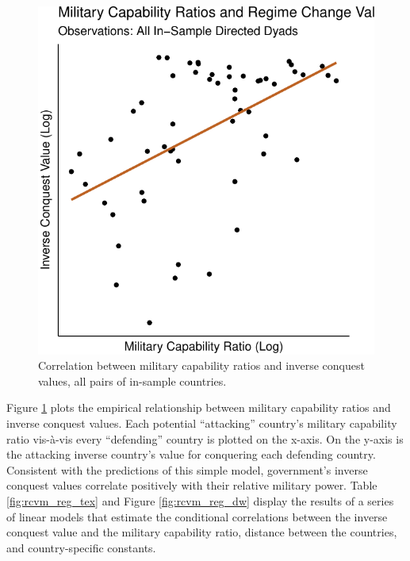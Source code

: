 \documentclass{puthesis}
\begin{document}
\begin{figure}
\centering
\includegraphics{figure/rcvm-1.pdf}
\caption{Correlation between military capability ratios and inverse
conquest values, all pairs of in-sample countries. \label{fig:rcvm}}
\end{figure}

Figure \ref{fig:rcvm} plots the empirical relationship between military
capability ratios and inverse conquest values. Each potential
``attacking'' country's military capability ratio vis-à-vis every
``defending'' country is plotted on the x-axis. On the y-axis is the
attacking inverse country's value for conquering each defending country.
Consistent with the predictions of this simple model, government's
inverse conquest values correlate positively with their relative
military power. Table \ref{fig:rcvm_reg_tex} and Figure
\ref{fig:rcvm_reg_dw} display the results of a series of linear models
that estimate the conditional correlations between the inverse conquest
value and the military capability ratio, distance between the countries,
and country-specific constants.
\end{document}
